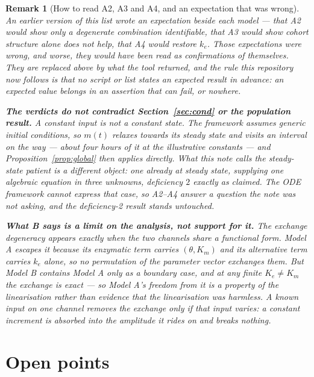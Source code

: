 \documentclass[11pt,a4paper]{article}
\newtheorem{remark}{Remark}
\begin{document}
\begin{remark}[How to read A2, A3 and A4, and an expectation that was wrong]
An earlier version of this list wrote an \emph{expectation} beside each model --- that A2
would show only a degenerate combination identifiable, that A3 would show cohort structure
alone does not help, that A4 would restore $k_e$. Those expectations were wrong, and worse,
they would have been read as confirmations of themselves. They are replaced above by what
the tool returned, and the rule this repository now follows is that no script or list
states an expected result in advance: an expected value belongs in an assertion that can
fail, or nowhere.

\textbf{The verdicts do not contradict Section~\ref{sec:cond} or the population result.} A
constant \emph{input} is not a constant \emph{state}. The framework assumes generic initial
conditions, so $m(t)$ relaxes towards its steady state and visits an interval on the way ---
about four hours of it at the illustrative constants --- and Proposition~\ref{prop:global}
then applies directly. What this note calls the steady-state patient is a different object:
one already \emph{at} steady state, supplying one algebraic equation in three unknowns,
deficiency $2$ exactly as claimed. The ODE framework cannot express that case, so A2--A4
answer a question the note was not asking, and the deficiency-2 result stands untouched.

\textbf{What B says is a limit on the analysis, not support for it.} The exchange
degeneracy appears exactly when the two channels share a functional form. Model A escapes
it because its enzymatic term carries $(\theta,K_m)$ and its alternative term carries $k_e$
alone, so no permutation of the parameter vector exchanges them. But Model B contains Model
A only as a boundary case, and at any finite $K_e \neq K_m$ the exchange is exact --- so
Model A's freedom from it is a property of the linearisation rather than evidence that the
linearisation was harmless. A known input on one channel removes the exchange only if that
input \emph{varies}: a constant increment is absorbed into the amplitude it rides on and
breaks nothing.
\end{remark}

\section{Open points}
\end{document}
